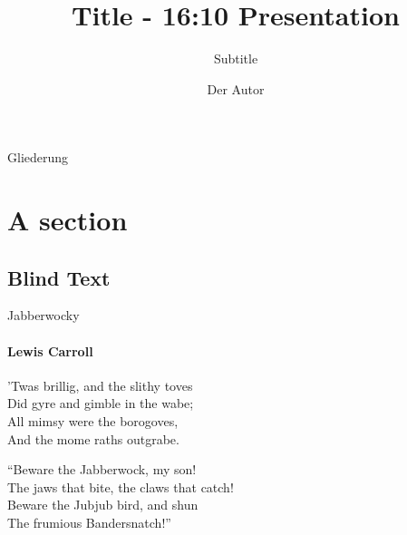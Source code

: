 \documentclass[aspectratio=1610, compress]{beamer}
\title{Title - 16:10 Presentation} %
\subtitle{Subtitle} %
\author{Der Autor}
\begin{document}
\frame[plain]{\maketitle}
\begin{frame}[plain]{Gliederung}
\tableofcontents[subsectionstyle=hide]
\end{frame}
	

\section{A section}
\subsection{Blind Text}
\begin{frame}{Jabberwocky}
\framesubtitle{Lewis Carroll}%
%
'Twas brillig, and the slithy toves\\
Did gyre and gimble in the wabe;\\
All mimsy were the borogoves,\\
And the mome raths outgrabe.\\\bigskip

“Beware the Jabberwock, my son!\\
The jaws that bite, the claws that catch!\\
Beware the Jubjub bird, and shun\\
The frumious Bandersnatch!”\\
\end{frame}
\end{document}
